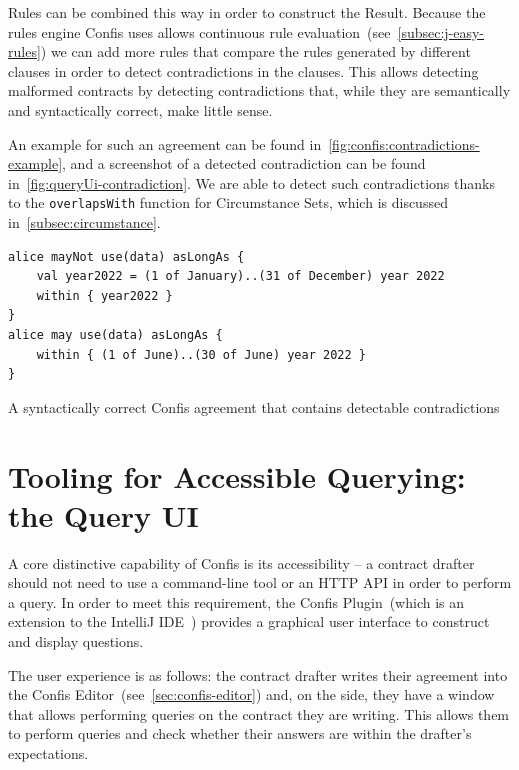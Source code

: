 Rules can be combined this way in order to construct the Result.
Because the rules engine Confis uses allows continuous rule evaluation~(see~\autoref{subsec:j-easy-rules}) we can add more rules that compare the rules generated by different clauses in order to detect contradictions in the clauses.
This allows detecting malformed contracts by detecting contradictions that, while they are semantically and syntactically correct, make little sense.

An example for such an agreement can be found in~\autoref{fig:confis:contradictions-example}, and a screenshot of a detected contradiction can be found in~\autoref{fig:queryUi-contradiction}.
We are able to detect such contradictions thanks to the \texttt{overlapsWith} function for Circumstance Sets, which is discussed in~\autoref{subsec:circumstance}.


\begin{listing}[h]
    \centering
    \begin{verbatim}
alice mayNot use(data) asLongAs {
    val year2022 = (1 of January)..(31 of December) year 2022
    within { year2022 }
}
alice may use(data) asLongAs {
    within { (1 of June)..(30 of June) year 2022 }
}
    \end{verbatim}
    \caption{A syntactically correct Confis agreement that contains detectable contradictions}
    \label{fig:confis:contradictions-example}
\end{listing}




\section[Query UI]{Tooling for Accessible Querying: the Query UI}\label{sec:queryUI}

A core distinctive capability of Confis is its accessibility -- a contract drafter should not need to use a command-line tool or an HTTP API in order to perform a query.
In order to meet this requirement, the Confis Plugin~(which is an extension to the IntelliJ IDE~\cite{intelliJRepo, ideaExtensionPoints}) provides a graphical user interface to construct and display questions.

The user experience is as follows: the contract drafter writes their agreement into the Confis Editor~(see~\autoref{sec:confis-editor}) and, on the side, they have a window that allows performing queries on the contract they are writing.
This allows them to perform queries and check whether their answers are within the drafter's expectations.


